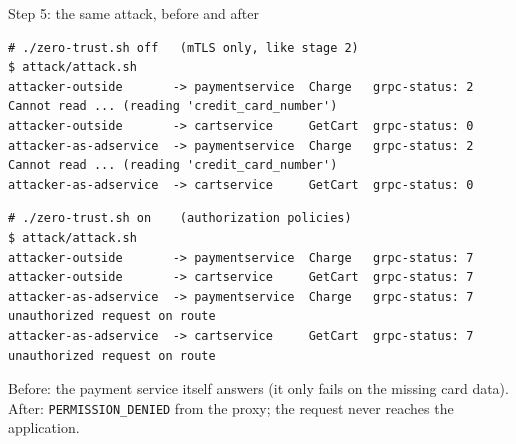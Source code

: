 \documentclass[9pt,aspectratio=169]{beamer}
\begin{document}
\begin{frame}[fragile]{Step 5: the same attack, before and after}
\begin{lstlisting}[language={}, morecomment={[l]{\#}}, basicstyle=\ttfamily\fontsize{6}{7.4}\selectfont]
# ./zero-trust.sh off   (mTLS only, like stage 2)
$ attack/attack.sh
attacker-outside       -> paymentservice  Charge   grpc-status: 2  Cannot read ... (reading 'credit_card_number')
attacker-outside       -> cartservice     GetCart  grpc-status: 0
attacker-as-adservice  -> paymentservice  Charge   grpc-status: 2  Cannot read ... (reading 'credit_card_number')
attacker-as-adservice  -> cartservice     GetCart  grpc-status: 0
\end{lstlisting}
\vspace{4pt}
\begin{lstlisting}[language={}, morecomment={[l]{\#}}, basicstyle=\ttfamily\fontsize{6}{7.4}\selectfont]
# ./zero-trust.sh on    (authorization policies)
$ attack/attack.sh
attacker-outside       -> paymentservice  Charge   grpc-status: 7
attacker-outside       -> cartservice     GetCart  grpc-status: 7
attacker-as-adservice  -> paymentservice  Charge   grpc-status: 7  unauthorized request on route
attacker-as-adservice  -> cartservice     GetCart  grpc-status: 7  unauthorized request on route
\end{lstlisting}
  \vspace{6pt}
  \centering
  {\small Before: the payment service itself answers (it only fails on the missing card data).
  After: \alert{\texttt{PERMISSION\_DENIED}} from the proxy; the request never reaches the application.}
\end{frame}
\end{document}
